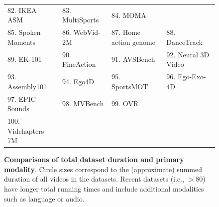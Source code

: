 \begin{figure}[t]
{\begin{tabular}{llll}
      82. IKEA ASM~\citep{ben2021ikea} &
      83. MultiSports~\citep{li2021multisports} &
      84. MOMA~\citep{luo2021moma} \\
      85. Spoken Moments~\citep{monfort2021spoken} &
      86. WebVid-2M~\citep{bain2021frozen} &
      87. Home action genome~\citep{rai2021home} & 
      88. DanceTrack~\citep{sun2022dancetrack} \\
      89. EK-101~\citep{damen2022rescaling} &
      90. FineAction~\citep{liu2022fineaction} &
      91. AVSBench~\citep{zhou2022audio} &
      92. Neural 3D Video~\citet{li2022neural} \\
      93. Assembly101~\citep{sener2022assembly101} &
      94. Ego4D \citep{grauman2022ego4d} &
      95. SportsMOT~\citep{cui2023sportsmot} &
      96. Ego-Exo-4D \citep{grauman2024ego} \\ 
      97. EPIC-Sounds \citep{huh2023epic} &
      98. MVBench \citep{li2024mvbench} &
      99. OVR \citep{dwibedi2024ovr} \\
      100. Vidchapters-7M \citep{yang2024vidchapters}
    \end{tabular}
    }
    \caption{\textbf{Comparisons of total dataset duration and primary modality}. Circle sizes correspond to the (approximate) summed duration of all videos in the datasets. Recent datasets (i.e., $>80$) have longer total running times and include additional modalities such as language or audio.}
    \label{fig:dataset_blobs}
\end{figure}

